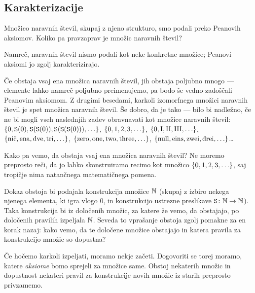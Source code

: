 
\subsection{Karakterizacije}

Množico naravnih števil, skupaj z njeno strukturo, smo podali preko Peanovih aksiomov. Koliko pa pravzaprav je množic naravnih števil?

Namreč, naravnih števil nismo podali kot neke konkretne množice; Peanovi aksiomi jo zgolj karakterizirajo. 

Če obstaja vsaj ena množica naravnih števil, jih obstaja poljubno mnogo --- elemente lahko namreč poljubno preimenujemo, pa bodo še vedno zadoščali Peanovim aksiomom. Z drugimi besedami, karkoli izomorfnega množici naravnih števil je spet množica naravnih števil. Še dobro, da je tako --- bilo bi nadležno, če ne bi mogli vseh naslednjih zadev obravnavati kot množice naravnih števil: $\set{0, \suc(0), \suc(\suc(0)), \suc(\suc(\suc(0))),\ldots}$, $\set{0, 1, 2, 3,\ldots}$, $\set{\mathrm{0}, \mathrm{I}, \mathrm{II}, \mathrm{III},\ldots}$, $\set{\text{nič}, \text{ena}, \text{dve}, \text{tri},\ldots}$, $\set{\text{zero}, \text{one}, \text{two}, \text{three},\ldots}$, $\set{\text{null}, \text{eins}, \text{zwei}, \text{drei},\ldots}$\ldots

Kako pa vemo, da obstaja vsaj ena množica naravnih števil? Ne moremo preprosto reči, da jo lahko skonstruiramo recimo kot množico $\set{0, 1, 2, 3,\ldots}$, saj tropičje nima natančnega matematičnega pomena.

Dokaz obstoja bi podajala konstrukcija množice $\mathbb{N}$ (skupaj z izbiro nekega njenega elementa, ki igra vlogo $0$, in konstrukcijo ustrezne preslikave $\mathtt{S}\colon \mathbb{N} \to \mathbb{N}$). Taka konstrukcija bi iz določenih množic, za katere že vemo, da obstajajo, po določenih pravilih izpeljala $\mathbb{N}$. Seveda to vprašanje obstoja zgolj pomakne za en korak nazaj: kako vemo, da te določene množice obstajajo in katera pravila za konstrukcijo množic so dopustna?

Če hočemo karkoli izpeljati, moramo nekje začeti. Dogovoriti se torej moramo, katere \emph{aksiome} bomo sprejeli za množice same. Obstoj nekaterih množic in dopustnost nekateri pravil za konstrukcije novih množic iz starih preprosto privzamemo.

